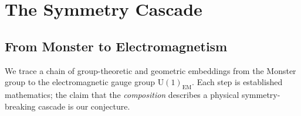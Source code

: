 \documentclass[11pt,a4paper]{article}
\theoremstyle{plain}
\theoremstyle{remark}
\begin{document}
\section{The Symmetry Cascade}
\label{sec:cascade}

\subsection{From Monster to Electromagnetism}
\label{sec:cascade-chain}

We trace a chain of group-theoretic and geometric embeddings from the
Monster group to the electromagnetic gauge group $\mathrm{U}(1)_{\mathrm{EM}}$.
Each step is established mathematics; the claim that the \emph{composition}
describes a physical symmetry-breaking cascade is our conjecture.
\end{document}
